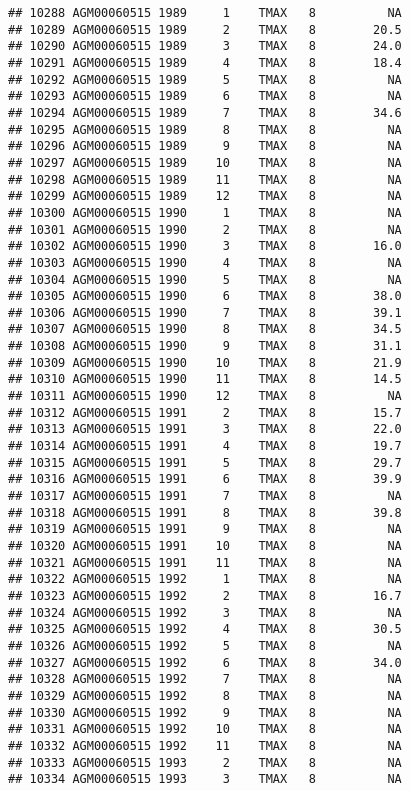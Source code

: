 \documentclass{article}\usepackage[]{graphicx}\usepackage[]{color}
\makeatletter
\newenvironment{kframe}{%
 \def\at@end@of@kframe{}%
 \ifinner\ifhmode%
  \def\at@end@of@kframe{\end{minipage}}%
  \begin{minipage}{\columnwidth}%
 \fi\fi%
 \def\FrameCommand##1{\hskip\@totalleftmargin \hskip-\fboxsep
 \colorbox{shadecolor}{##1}\hskip-\fboxsep
     \hskip-\linewidth \hskip-\@totalleftmargin \hskip\columnwidth}%
 \MakeFramed {\advance\hsize-\width
   \@totalleftmargin\z@ \linewidth\hsize
   \@setminipage}}%
 {\par\unskip\endMakeFramed%
 \at@end@of@kframe}
\newenvironment{knitrout}{}{} %
\makeatother
\begin{document}
\begin{knitrout}
\begin{kframe}
\begin{verbatim}
## 10288 AGM00060515 1989     1    TMAX   8          NA
## 10289 AGM00060515 1989     2    TMAX   8        20.5
## 10290 AGM00060515 1989     3    TMAX   8        24.0
## 10291 AGM00060515 1989     4    TMAX   8        18.4
## 10292 AGM00060515 1989     5    TMAX   8          NA
## 10293 AGM00060515 1989     6    TMAX   8          NA
## 10294 AGM00060515 1989     7    TMAX   8        34.6
## 10295 AGM00060515 1989     8    TMAX   8          NA
## 10296 AGM00060515 1989     9    TMAX   8          NA
## 10297 AGM00060515 1989    10    TMAX   8          NA
## 10298 AGM00060515 1989    11    TMAX   8          NA
## 10299 AGM00060515 1989    12    TMAX   8          NA
## 10300 AGM00060515 1990     1    TMAX   8          NA
## 10301 AGM00060515 1990     2    TMAX   8          NA
## 10302 AGM00060515 1990     3    TMAX   8        16.0
## 10303 AGM00060515 1990     4    TMAX   8          NA
## 10304 AGM00060515 1990     5    TMAX   8          NA
## 10305 AGM00060515 1990     6    TMAX   8        38.0
## 10306 AGM00060515 1990     7    TMAX   8        39.1
## 10307 AGM00060515 1990     8    TMAX   8        34.5
## 10308 AGM00060515 1990     9    TMAX   8        31.1
## 10309 AGM00060515 1990    10    TMAX   8        21.9
## 10310 AGM00060515 1990    11    TMAX   8        14.5
## 10311 AGM00060515 1990    12    TMAX   8          NA
## 10312 AGM00060515 1991     2    TMAX   8        15.7
## 10313 AGM00060515 1991     3    TMAX   8        22.0
## 10314 AGM00060515 1991     4    TMAX   8        19.7
## 10315 AGM00060515 1991     5    TMAX   8        29.7
## 10316 AGM00060515 1991     6    TMAX   8        39.9
## 10317 AGM00060515 1991     7    TMAX   8          NA
## 10318 AGM00060515 1991     8    TMAX   8        39.8
## 10319 AGM00060515 1991     9    TMAX   8          NA
## 10320 AGM00060515 1991    10    TMAX   8          NA
## 10321 AGM00060515 1991    11    TMAX   8          NA
## 10322 AGM00060515 1992     1    TMAX   8          NA
## 10323 AGM00060515 1992     2    TMAX   8        16.7
## 10324 AGM00060515 1992     3    TMAX   8          NA
## 10325 AGM00060515 1992     4    TMAX   8        30.5
## 10326 AGM00060515 1992     5    TMAX   8          NA
## 10327 AGM00060515 1992     6    TMAX   8        34.0
## 10328 AGM00060515 1992     7    TMAX   8          NA
## 10329 AGM00060515 1992     8    TMAX   8          NA
## 10330 AGM00060515 1992     9    TMAX   8          NA
## 10331 AGM00060515 1992    10    TMAX   8          NA
## 10332 AGM00060515 1992    11    TMAX   8          NA
## 10333 AGM00060515 1993     2    TMAX   8          NA
## 10334 AGM00060515 1993     3    TMAX   8          NA

\end{verbatim}
\end{kframe}
\end{knitrout}
\end{document}

